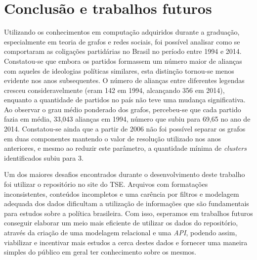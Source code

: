\chapter{Conclusão e trabalhos futuros}
\label{conclusao}

Utilizando os conhecimentos em computação adquiridos durante a graduação, especialmente em teoria de grafos e redes sociais, foi possível analisar como se comportaram as coligações partidárias no Brasil no período entre 1994 e 2014. Constatou-se que embora os partidos formassem um número maior de alianças com aqueles de ideologias políticas similares, esta distinção tornou-se menos evidente nos anos subsequentes. O número de alianças entre diferentes legendas cresceu consideravelmente (eram 142 em 1994, alcançando 356 em 2014), enquanto a quantidade de partidos no país não teve uma mudança significativa. Ao observar o grau médio ponderado dos grafos, percebeu-se que cada partido fazia em média, 33,043 alianças em 1994, número que subiu para 69,65 no ano de 2014. Constatou-se ainda que a partir de 2006 não foi possível separar os grafos em duas componentes mantendo o valor de resolução utilizado nos anos anteriores, e mesmo ao reduzir este parâmetro, a quantidade mínima de \emph{clusters} identificados subiu para 3.

Um dos maiores desafios encontrados durante o desenvolvimento deste trabalho foi utilizar o repositório no site do \gls{TSE}. Arquivos com formatações inconsistentes, conteúdos incompletos e uma carência por filtros e modelagem adequada dos dados dificultam a utilização de informações que são fundamentais para estudos sobre a política brasileira. Com isso, esperamos em trabalhos futuros conseguir elaborar um meio mais eficiente de utilizar os dados do repositório, através da criação de uma modelagem relacional e uma \emph{\gls{API}}, podendo assim,  viabilizar e incentivar mais estudos a cerca destes dados e fornecer uma maneira simples do público em geral ter conhecimento sobre os mesmos.



